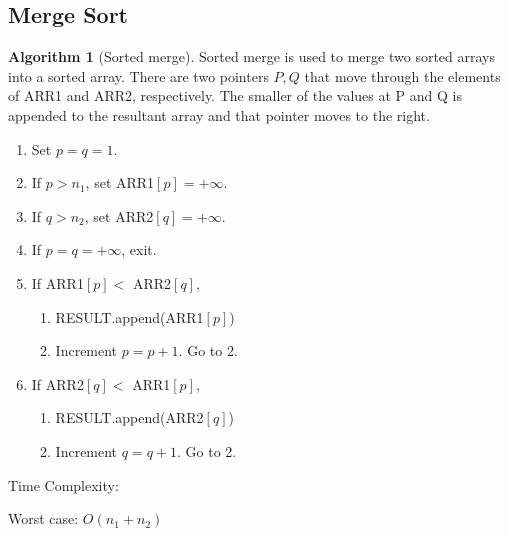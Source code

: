 \documentclass[10pt, a4paper]{extarticle}
\theoremstyle{definition}
\newtheorem{alg}{Algorithm}
\begin{document}
	\subsection{Merge Sort}
	\begin{alg}[Sorted merge]
		Sorted merge is used to merge two sorted arrays into a sorted array. There are two pointers $P,Q$ that move through the elements of ARR1 and ARR2, respectively. The smaller of the values at P and Q is appended to the resultant array and that pointer moves to the right.
		\begin{enumerate}
			\item Set $p=q=1$.
			\item If $p>n_1$, set ARR1$[p]=+\infty$.
			\item If $q>n_2$, set ARR2$[q]=+\infty$.
			\item If $p=q=+\infty$, exit.
			\item If ARR1$[p]<$ ARR2$[q]$,
				\begin{enumerate}
					\item RESULT.append(ARR1$[p]$)
					\item Increment $p=p+1$. Go to 2.
			\end{enumerate}
			\item If ARR2$[q]<$ ARR1$[p]$,
				\begin{enumerate}
					\item RESULT.append(ARR2$[q]$)
					\item Increment $q=q+1$. Go to 2.
			\end{enumerate}
	\end{enumerate}
	Time Complexity:

	Worst case: $O(n_1+ n_2)$
	\end{alg}
\end{document}
